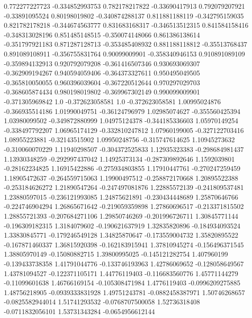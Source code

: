  0.772277227723  -0.334852993753
 0.782178217822   -0.33690417913
 0.792079207921   -0.33891095524
  0.80198019802  -0.340874288137
 0.811881188119  -0.342795159035
 0.821782178218  -0.344674563777
 0.831683168317  -0.346513512315
 0.841584158416  -0.348313028196
 0.851485148515  -0.350074148066
 0.861386138614  -0.351797921183
 0.871287128713  -0.353485408932
 0.881188118812   -0.35513768437
 0.891089108911  -0.356755831764
  0.90099009901  -0.358340946153
 0.910891089109  -0.359894132913
 0.920792079208  -0.361416507346
 0.930693069307  -0.362909194267
 0.940594059406  -0.364373327611
 0.950495049505  -0.365810050055
 0.960396039604  -0.367220512644
 0.970297029703  -0.368605874434
 0.980198019802  -0.369967302149
 0.990099009901  -0.371305969842
            1.0  -0.372623058581
            1.0  -0.372623058581
  1.00995024876  -0.366935514186
  1.01990049751   -0.36124796979
  1.02985074627  -0.355560425394
  1.03980099502  -0.349872880999
  1.04975124378  -0.344185336603
  1.05970149254  -0.338497792207
  1.06965174129  -0.332810247812
  1.07960199005  -0.327122703416
  1.08955223881   -0.32143515902
  1.09950248756  -0.315747614625
  1.10945273632  -0.310060070229
  1.11940298507  -0.304372525833
  1.12935323383  -0.298684981437
  1.13930348259  -0.292997437042
  1.14925373134  -0.287309892646
   1.1592039801   -0.28162234825
  1.16915422886  -0.275934803855
  1.17910447761  -0.270247259459
  1.18905472637  -0.264559715063
  1.19900497512  -0.258872170668
  1.20895522388  -0.253184626272
  1.21890547264  -0.247497081876
  1.22885572139  -0.241809537481
  1.23880597015  -0.236121993085
  1.24875621891  -0.230434448689
  1.25870646766  -0.224746904294
  1.26865671642  -0.219059359898
  1.27860696517  -0.213371815502
  1.28855721393  -0.207684271106
  1.29850746269  -0.201996726711
  1.30845771144  -0.196309182315
   1.3184079602  -0.190621637919
  1.32835820896  -0.184934093524
  1.33830845771  -0.179246549128
  1.34825870647  -0.173559004732
  1.35820895522  -0.167871460337
  1.36815920398  -0.162183915941
  1.37810945274  -0.156496371545
  1.38805970149   -0.15080882715
  1.39800995025  -0.145121282754
    1.407960199  -0.139433738358
  1.41791044776  -0.133746193963
  1.42786069652  -0.128058649567
  1.43781094527  -0.122371105171
  1.44776119403  -0.116683560776
  1.45771144279   -0.11099601638
  1.46766169154  -0.105308471984
   1.4776119403  -0.0996209275885
  1.48756218905  -0.0939333831928
  1.49751243781  -0.0882458387971
  1.50746268657  -0.0825582944014
  1.51741293532  -0.0768707500058
  1.52736318408  -0.0711832056101
  1.53731343284  -0.0654956612144
